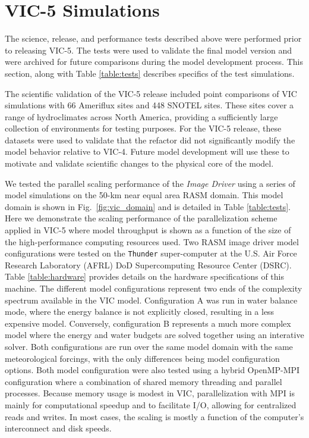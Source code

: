 \documentclass[gmd, manuscript]{copernicus}
\begin{document}
  \section{VIC-5 Simulations}
    \label{sec:vic-5_simulations}

    The science, release, and performance tests described above were performed prior to releasing VIC-5. The tests were used to validate the final model version and were archived for future comparisons during the model development process. This section, along with Table \ref{table:tests} describes specifics of the test simulations.

    The scientific validation of the VIC-5 release included point comparisons of VIC simulations with 66 Ameriflux sites \citep{Baldocchi_1996,Baldocchi_2001,Bohn_2016} and 448 SNOTEL sites. These sites cover a range of hydroclimates across North America, providing a sufficiently large collection of environments for testing purposes. For the VIC-5 release, these datasets were used to validate that the refactor did not significantly modify the model behavior relative to VIC-4. Future model development will use these to motivate and validate scientific changes to the physical core of the model.  %

    We tested the parallel scaling performance of the \textit{Image Driver} using a series of model simulations on the 50-km near equal area RASM domain. This model domain is shown in Fig.~\ref{fig:vic_domain} and is detailed in Table \ref{table:tests}. Here we demonstrate the scaling performance of the parallelization scheme applied in VIC-5 where model throughput is shown as a function of the size of the high-performance computing resources used. Two RASM image driver model configurations were tested on the \verb|Thunder| super-computer at the U.S. Air Force Research Laboratory (AFRL) DoD Supercomputing Resource Center (DSRC). Table \ref{table:hardware} provides details on the hardware specifications of this machine. The different model configurations represent two ends of the complexity spectrum available in the VIC model. Configuration A was run in water balance mode, where the energy balance is not explicitly closed, resulting in a less expensive model. Conversely, configuration B represents a much more complex model where the energy and water budgets are solved together using an interative solver. Both configurations are run over the same model domain with the same meteorological forcings, with the only differences being model configuration options. Both model configuration were also tested using a hybrid OpenMP-MPI configuration where a combination of shared memory threading and parallel processes. Because memory usage is modest in VIC, parallelization with MPI is mainly for computational speedup and to facilitate I/O, allowing for centralized reads and writes. In most cases, the scaling is mostly a function of the computer's interconnect and disk speeds.
\end{document}
